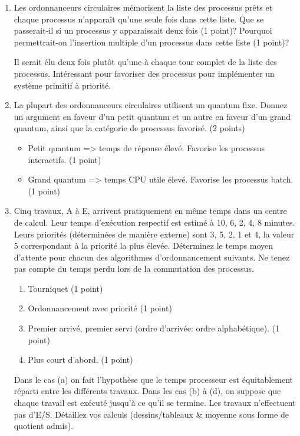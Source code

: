 \begin{enumerate}
\item Les ordonnanceurs circulaires mémorisent la liste des processus prêts et chaque processus n'apparaît qu'une seule fois dans cette liste. Que se passerait-il si un processus y apparaissait deux fois (1 point)? Pourquoi permettrait-on l'insertion multiple d'un processus dans cette liste (1 point)?

\begin{correction}
Il serait élu deux fois plutôt qu'une à chaque tour complet de la liste des processus. Intéressant pour favoriser des processus pour implémenter un système primitif à priorité.
\end{correction}


\item La plupart des ordonnanceurs circulaires utilisent un quantum fixe. Donnez un argument en faveur d'un petit quantum et un autre en faveur d'un grand quantum, ainsi que la catégorie de processus favorisé. (2 points)

\begin{correction}
\begin{itemize}
  \item Petit quantum => temps de réponse élevé. Favorise les processus interactifs.  (1 point)
  \item Grand quantum => temps CPU utile élevé. Favorise les processus batch. (1 point)
\end{itemize}
\end{correction}


\item Cinq travaux, A à E, arrivent pratiquement en même temps dans un centre de calcul. Leur temps d'exécution respectif est estimé à 10, 6, 2, 4, 8 minutes. Leurs priorités (déterminées de manière externe) sont 3, 5, 2, 1 et 4, la valeur 5 correspondant à la priorité la plus élevée. Déterminez le temps moyen d'attente pour chacun des algorithmes d'ordonnancement suivants. Ne tenez pas compte du temps perdu lors de la commutation des processus.
  \begin{enumerate}
  \item Tourniquet (1 point)
  \item Ordonnancement avec priorité (1 point)
  \item Premier arrivé, premier servi (ordre d'arrivée: ordre alphabétique). (1 point)
  \item Plus court d'abord. (1 point)
  \end{enumerate}
Dans le cas (a) on fait l'hypothèse que le temps processeur est équitablement réparti entre les différents travaux. Dans les cas (b) à (d), on suppose que chaque travail est exécuté jusqu'à ce qu'il se termine. Les travaux n'effectuent pas d'E/S. Détaillez vos calculs (dessins/tableaux \& moyenne sous forme de quotient admis).


\end{enumerate}

